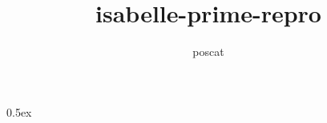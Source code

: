 \documentclass[11pt,a4paper]{article}
\begin{document}
\title{isabelle-prime-repro}
\author{poscat}
\maketitle

\tableofcontents

\parindent 0pt\parskip 0.5ex



%
%
\end{document}
